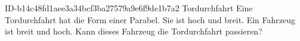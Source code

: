 \begin{exercise}
      {ID-b14c48fd1aee3a34bcf3ba27579a9e6f9de1b7a2}
      {Tordurchfahrt}
  \ifproblem\problem
    Eine Tordurchfahrt hat die Form einer Parabel. Sie ist  hoch
    und  breit. Ein Fahrzeug ist  breit und 
    hoch. Kann dieses Fahrzeug die Tordurchfahrt passieren?
  \fi
\end{exercise}

